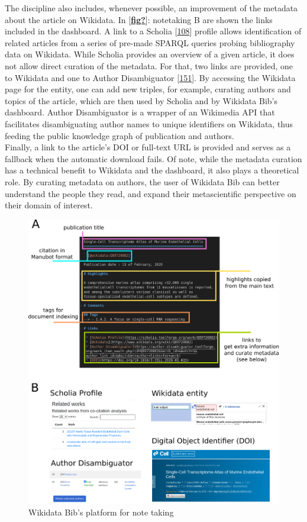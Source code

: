 The discipline also includes, whenever possible, an improvement of the metadata about the article on Wikidata.
In {[}\protect\hyperlink{ref-fig}{\textbf{fig?}}{]}: notetaking B are shown the links included in the dashboard.
A link to a Scholia {[}\protect\hyperlink{ref-hxzL9pmm}{108}{]} profile allows identification of related articles from a series of pre-made SPARQL queries probing bibliography data on Wikidata.
While Scholia provides an overview of a given article, it does not allow direct curation of the metadata.
For that, two links are provided, one to Wikidata and one to Author Disambiguator {[}\protect\hyperlink{ref-1A9RvszKC}{151}{]}.
By accessing the Wikidata page for the entity, one can add new triples, for example, curating authors and topics of the article, which are then used by Scholia and by Wikidata Bib's dashboard.
Author Disambiguator is a wrapper of an Wikimedia API that facilitates disambiguating author names to unique identifiers on Wikidata, thus feeding the public knowledge graph of publication and authors.\\
Finally, a link to the article's DOI or full-text URL is provided and serves as a fallback when the automatic download fails.
Of note, while the metadata curation has a technical benefit to Wikidata and the dashboard, it also plays a theoretical role.
By curating metadata on authors, the user of Wikidata Bib can better understand the people they read, and expand their metascientific perspective on their domain of interest.

\begin{figure}
\hypertarget{fig:notetaking}{%
\centering
\includegraphics{images/note_taking_station_annotated_with_links.png}
\caption{Wikidata Bib's platform for note taking}\label{fig:notetaking}
}
\end{figure}

